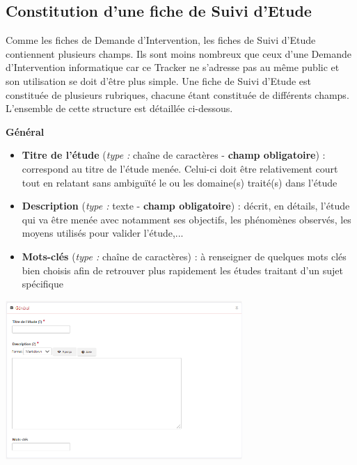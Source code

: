 \subsection{Constitution d'une fiche de Suivi d'Etude}
Comme les fiches de Demande d'Intervention, les fiches de Suivi d'Etude contiennent plusieurs champs. Ils sont moins nombreux que ceux d'une Demande d'Intervention informatique car ce Tracker ne s'adresse pas au même public et son utilisation se doit d'être plus simple.  Une fiche de Suivi d'Etude est constituée de plusieurs rubriques, chacune étant constituée de différents champs. L'ensemble de cette structure est détaillée ci-dessous.\\
\begin{minipage}[c]{0.45\linewidth}
\textbf{Général}

\begin{itemize}[label=$\Rightarrow$, font=\LARGE]
   \item \textbf{Titre de l'étude} (\textit{type :} chaîne de caractères - \textbf{champ obligatoire}) : correspond au titre de l'étude menée. Celui-ci doit être relativement court tout en relatant sans ambiguïté le ou les domaine(s) traité(s) dans l'étude
   \item \textbf{Description} (\textit{type :} texte - \textbf{champ obligatoire}) : décrit, en détails, l'étude qui va être menée avec notamment ses objectifs, les phénomènes observés, les moyens utilisés pour valider l'étude,...
   \item \textbf{Mots-clés} (\textit{type :} chaîne de caractères) : à renseigner de quelques mots clés bien choisis afin de retrouver plus rapidement les études traitant d'un sujet spécifique
\end{itemize}

\end{minipage} \hfill
\begin{minipage}[c]{0.5\linewidth}
   \includegraphics[width=9cm,trim = 0 0 100 0 , clip = true]{pictures/GEA-general.png}\vspace*{0.2cm}

\end{minipage}

